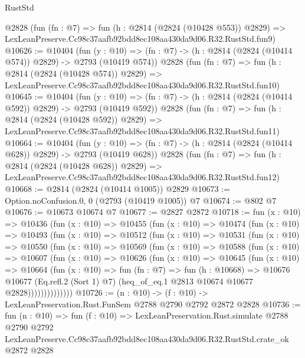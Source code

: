 \begin{lexlean}{RustStd}
\begin{coremodule}
    @2828
    (fun (fn : @7) =>
    fun (h : @2814 (@2824 (@10428 @553)) @2829) =>
    LexLeanPreserve.Cc98c37aafb92bdd8ec108aa430da9d06.R32.RustStd.fun9)
@10626 := @10404
    (fun (y : @10) => (fn : @7) -> (h : @2814 (@2824 (@10414 @574)) @2829) -> @2793 (@10419 @574))
    @2828
    (fun (fn : @7) =>
    fun (h : @2814 (@2824 (@10428 @574)) @2829) =>
    LexLeanPreserve.Cc98c37aafb92bdd8ec108aa430da9d06.R32.RustStd.fun10)
@10645 := @10404
    (fun (y : @10) => (fn : @7) -> (h : @2814 (@2824 (@10414 @592)) @2829) -> @2793 (@10419 @592))
    @2828
    (fun (fn : @7) =>
    fun (h : @2814 (@2824 (@10428 @592)) @2829) =>
    LexLeanPreserve.Cc98c37aafb92bdd8ec108aa430da9d06.R32.RustStd.fun11)
@10664 := @10404
    (fun (y : @10) => (fn : @7) -> (h : @2814 (@2824 (@10414 @628)) @2829) -> @2793 (@10419 @628))
    @2828
    (fun (fn : @7) =>
    fun (h : @2814 (@2824 (@10428 @628)) @2829) =>
    LexLeanPreserve.Cc98c37aafb92bdd8ec108aa430da9d06.R32.RustStd.fun12)
@10668 := @2814 (@2824 (@10414 @1005)) @2829
@10673 := Option.noConfusion.{0, 0} (@2793 (@10419 @1005)) @7
@10674 := @802 @7
@10676 := @10673 @10674 @7
@10677 := @2827 @2872
@10718 := fun (x : @10) =>
  @10436
    (fun (x : @10) =>
    @10455
      (fun (x : @10) =>
      @10474
        (fun (x : @10) =>
        @10493
          (fun (x : @10) =>
          @10512
            (fun (x : @10) =>
            @10531
              (fun (x : @10) =>
              @10550
                (fun (x : @10) =>
                @10569
                  (fun (x : @10) =>
                  @10588
                    (fun (x : @10) =>
                    @10607
                      (fun (x : @10) =>
                      @10626
                        (fun (x : @10) =>
                        @10645
                          (fun (x : @10) =>
                          @10664
                            (fun (x : @10) =>
                            fun (fn : @7) =>
                            fun (h : @10668) =>
                            @10676
                              @10677
                              (Eq.refl.{2} (Sort 1) @7)
                              (heq_of_eq.{1} @2813 @10674 @10677 @2828))))))))))))))
@10726 := (n : @10) -> (f : @10) -> LexLeanPreservation.Rust.FunSem @2788 @2790 @2792 @2872 @2828
@10736 := fun (n : @10) =>
  fun (f : @10) =>
  LexLeanPreservation.Rust.simulate
    @2788
    @2790
    @2792
    LexLeanPreserve.Cc98c37aafb92bdd8ec108aa430da9d06.R32.RustStd.crate_ok
    @2872
    @2828
\end{coremodule}
\end{lexlean}
